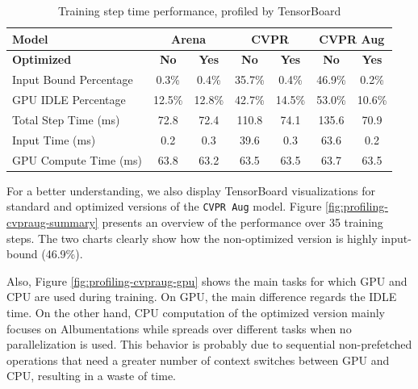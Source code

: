 \begin{table}[H]
	\caption{Training step time performance, profiled by TensorBoard}
	\label{tab:data-generator-profiling}
	\centering
	\begin{tabular}{|l|c|c||c|c||c|c|}
		\hline
		\textbf{Model} & \multicolumn{2}{|c||}{\textbf{Arena}} & \multicolumn{2}{|c||}{\textbf{CVPR}} & \multicolumn{2}{|c|}{\textbf{CVPR Aug}} \\
		\hline
		\textbf{Optimized} & \textbf{No} & \textbf{Yes} & \textbf{No} & \textbf{Yes} & \textbf{No} & \textbf{Yes} \\
		\hline
		Input Bound Percentage      &  0.3\% &  0.4\% & 35.7\% &  0.4\% & 46.9\% &  0.2\% \\
		GPU IDLE Percentage         & 12.5\% & 12.8\% & 42.7\% & 14.5\% & 53.0\% & 10.6\% \\
		\hline
		Total Step Time (ms)        &   72.8 &   72.4 &  110.8 &   74.1 &  135.6 &   70.9 \\
		Input Time (ms)             &    0.2 &    0.3 &   39.6 &    0.3 &   63.6 &    0.2 \\
		GPU Compute Time (ms)       &   63.8 &   63.2 &   63.5 &   63.5 &   63.7 &   63.5 \\
		\hline
	\end{tabular}
\end{table}

For a better understanding, we also display TensorBoard visualizations for standard and optimized versions of the \texttt{CVPR Aug} model. Figure \ref{fig:profiling-cvpraug-summary} presents an overview of the performance over 35 training steps. The two charts clearly show how the non-optimized version is highly input-bound (46.9\%).

Also, Figure \ref{fig:profiling-cvpraug-gpu} shows the main tasks for which GPU and CPU are used during training. On GPU, the main difference regards the IDLE time. On the other hand, CPU computation of the optimized version mainly focuses on Albumentations while spreads over different tasks when no parallelization is used. This behavior is probably due to sequential non-prefetched operations that need a greater number of context switches between GPU and CPU, resulting in a waste of time.

